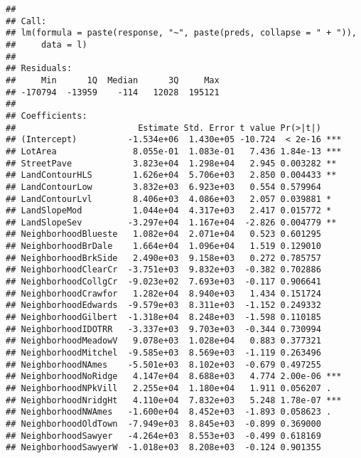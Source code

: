 \documentclass[
]{article}
\newenvironment{Shaded}{\begin{snugshade}}{\end{snugshade}}
\newcommand{\FunctionTok}[1]{\textcolor[rgb]{0.00,0.00,0.00}{#1}}
\newcommand{\NormalTok}[1]{#1}
\newcommand{\OtherTok}[1]{\textcolor[rgb]{0.56,0.35,0.01}{#1}}
\newcommand{\SpecialCharTok}[1]{\textcolor[rgb]{0.00,0.00,0.00}{#1}}
\begin{document}
\begin{Shaded}
\end{Shaded}

\begin{verbatim}
## 
## Call:
## lm(formula = paste(response, "~", paste(preds, collapse = " + ")), 
##     data = l)
## 
## Residuals:
##     Min      1Q  Median      3Q     Max 
## -170794  -13959    -114   12028  195121 
## 
## Coefficients:
##                        Estimate Std. Error t value Pr(>|t|)    
## (Intercept)          -1.534e+06  1.430e+05 -10.724  < 2e-16 ***
## LotArea               8.055e-01  1.083e-01   7.436 1.84e-13 ***
## StreetPave            3.823e+04  1.298e+04   2.945 0.003282 ** 
## LandContourHLS        1.626e+04  5.706e+03   2.850 0.004433 ** 
## LandContourLow        3.832e+03  6.923e+03   0.554 0.579964    
## LandContourLvl        8.406e+03  4.086e+03   2.057 0.039881 *  
## LandSlopeMod          1.044e+04  4.317e+03   2.417 0.015772 *  
## LandSlopeSev         -3.297e+04  1.167e+04  -2.826 0.004779 ** 
## NeighborhoodBlueste   1.082e+04  2.071e+04   0.523 0.601295    
## NeighborhoodBrDale    1.664e+04  1.096e+04   1.519 0.129010    
## NeighborhoodBrkSide   2.490e+03  9.158e+03   0.272 0.785757    
## NeighborhoodClearCr  -3.751e+03  9.832e+03  -0.382 0.702886    
## NeighborhoodCollgCr  -9.023e+02  7.693e+03  -0.117 0.906641    
## NeighborhoodCrawfor   1.282e+04  8.940e+03   1.434 0.151724    
## NeighborhoodEdwards  -9.579e+03  8.311e+03  -1.152 0.249332    
## NeighborhoodGilbert  -1.318e+04  8.248e+03  -1.598 0.110185    
## NeighborhoodIDOTRR   -3.337e+03  9.703e+03  -0.344 0.730994    
## NeighborhoodMeadowV   9.078e+03  1.028e+04   0.883 0.377321    
## NeighborhoodMitchel  -9.585e+03  8.569e+03  -1.119 0.263496    
## NeighborhoodNAmes    -5.501e+03  8.102e+03  -0.679 0.497255    
## NeighborhoodNoRidge   4.147e+04  8.688e+03   4.774 2.00e-06 ***
## NeighborhoodNPkVill   2.255e+04  1.180e+04   1.911 0.056207 .  
## NeighborhoodNridgHt   4.110e+04  7.832e+03   5.248 1.78e-07 ***
## NeighborhoodNWAmes   -1.600e+04  8.452e+03  -1.893 0.058623 .  
## NeighborhoodOldTown  -7.949e+03  8.845e+03  -0.899 0.369000    
## NeighborhoodSawyer   -4.264e+03  8.553e+03  -0.499 0.618169    
## NeighborhoodSawyerW  -1.018e+03  8.208e+03  -0.124 0.901355    

\end{verbatim}
\end{document}
